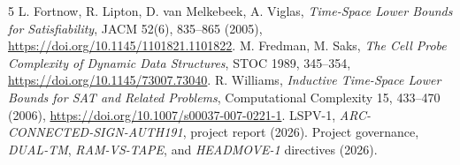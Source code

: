\documentclass[11pt]{article}
\begin{document}
\begin{thebibliography}{5}
 L. Fortnow, R. Lipton, D. van Melkebeek, A. Viglas,
\emph{Time-Space Lower Bounds for Satisfiability}, JACM 52(6), 835--865
(2005), \url{https://doi.org/10.1145/1101821.1101822}.
 M. Fredman, M. Saks, \emph{The Cell Probe Complexity of Dynamic
Data Structures}, STOC 1989, 345--354,
\url{https://doi.org/10.1145/73007.73040}.
 R. Williams, \emph{Inductive Time-Space Lower Bounds for
SAT and Related Problems}, Computational Complexity 15, 433--470 (2006),
\url{https://doi.org/10.1007/s00037-007-0221-1}.
 LSPV-1, \emph{ARC-CONNECTED-SIGN-AUTH191}, project report
(2026).
 Project governance, \emph{DUAL-TM}, \emph{RAM-VS-TAPE}, and
\emph{HEADMOVE-1} directives (2026).
\end{thebibliography}
\end{document}
